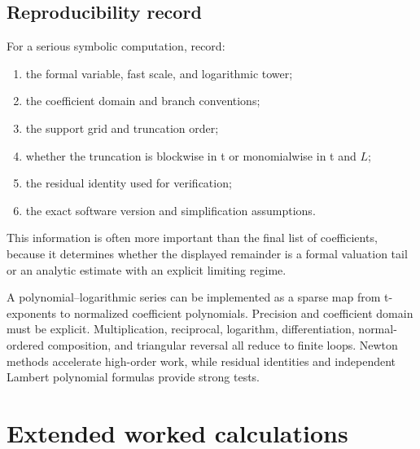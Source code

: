 \documentclass[11pt,openany]{book}
\theoremstyle{definition}
\theoremstyle{plain}
\theoremstyle{remark}
\begin{document}
\section{Reproducibility record}
For a serious symbolic computation, record:
\begin{enumerate}
\item the formal variable, fast scale, and logarithmic tower;
\item the coefficient domain and branch conventions;
\item the support grid and truncation order;
\item whether the truncation is blockwise in t or monomialwise in t and \(L\);
\item the residual identity used for verification;
\item the exact software version and simplification assumptions.
\end{enumerate}
This information is often more important than the final list of coefficients,
because it determines whether the displayed remainder is a formal valuation
tail or an analytic estimate with an explicit limiting regime.

\begin{summarybox}
A polynomial--logarithmic series can be implemented as a sparse map from
t-exponents to normalized coefficient polynomials.  Precision and coefficient
domain must be explicit.  Multiplication, reciprocal, logarithm,
differentiation, normal-ordered composition, and triangular reversal all reduce
to finite loops.  Newton methods accelerate high-order work, while residual
identities and independent Lambert polynomial formulas provide strong tests.
\end{summarybox}

\chapter{Extended worked calculations}\label{ch:worked}
\end{document}
